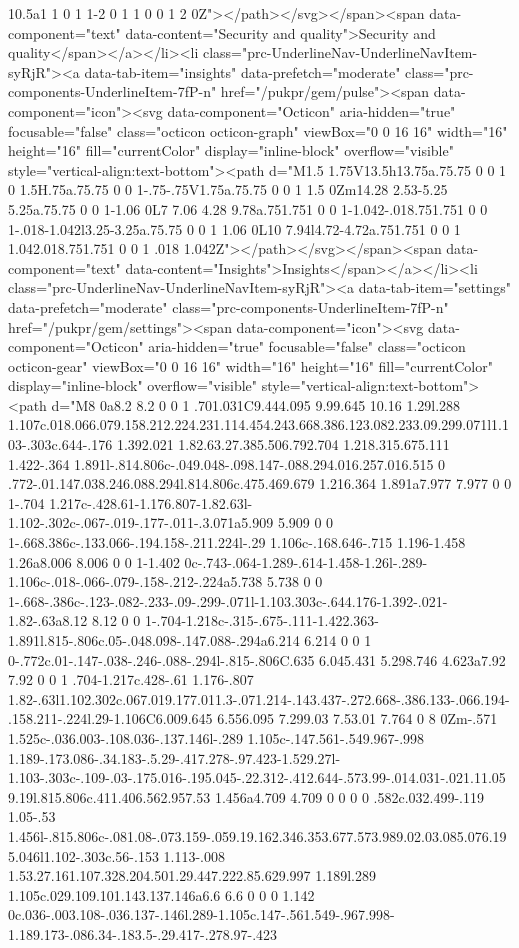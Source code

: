 10.5a1 1 0 1 1-2 0 1 1 0 0 1 2 0Z"></path></svg></span><span data-component="text" data-content="Security and quality">Security and quality</span></a></li><li class="prc-UnderlineNav-UnderlineNavItem-syRjR"><a data-tab-item="insights" data-prefetch="moderate" class="prc-components-UnderlineItem-7fP-n" href="/pukpr/gem/pulse"><span data-component="icon"><svg data-component="Octicon" aria-hidden="true" focusable="false" class="octicon octicon-graph" viewBox="0 0 16 16" width="16" height="16" fill="currentColor" display="inline-block" overflow="visible" style="vertical-align:text-bottom"><path d="M1.5 1.75V13.5h13.75a.75.75 0 0 1 0 1.5H.75a.75.75 0 0 1-.75-.75V1.75a.75.75 0 0 1 1.5 0Zm14.28 2.53-5.25 5.25a.75.75 0 0 1-1.06 0L7 7.06 4.28 9.78a.751.751 0 0 1-1.042-.018.751.751 0 0 1-.018-1.042l3.25-3.25a.75.75 0 0 1 1.06 0L10 7.94l4.72-4.72a.751.751 0 0 1 1.042.018.751.751 0 0 1 .018 1.042Z"></path></svg></span><span data-component="text" data-content="Insights">Insights</span></a></li><li class="prc-UnderlineNav-UnderlineNavItem-syRjR"><a data-tab-item="settings" data-prefetch="moderate" class="prc-components-UnderlineItem-7fP-n" href="/pukpr/gem/settings"><span data-component="icon"><svg data-component="Octicon" aria-hidden="true" focusable="false" class="octicon octicon-gear" viewBox="0 0 16 16" width="16" height="16" fill="currentColor" display="inline-block" overflow="visible" style="vertical-align:text-bottom"><path d="M8 0a8.2 8.2 0 0 1 .701.031C9.444.095 9.99.645 10.16 1.29l.288 1.107c.018.066.079.158.212.224.231.114.454.243.668.386.123.082.233.09.299.071l1.103-.303c.644-.176 1.392.021 1.82.63.27.385.506.792.704 1.218.315.675.111 1.422-.364 1.891l-.814.806c-.049.048-.098.147-.088.294.016.257.016.515 0 .772-.01.147.038.246.088.294l.814.806c.475.469.679 1.216.364 1.891a7.977 7.977 0 0 1-.704 1.217c-.428.61-1.176.807-1.82.63l-1.102-.302c-.067-.019-.177-.011-.3.071a5.909 5.909 0 0 1-.668.386c-.133.066-.194.158-.211.224l-.29 1.106c-.168.646-.715 1.196-1.458 1.26a8.006 8.006 0 0 1-1.402 0c-.743-.064-1.289-.614-1.458-1.26l-.289-1.106c-.018-.066-.079-.158-.212-.224a5.738 5.738 0 0 1-.668-.386c-.123-.082-.233-.09-.299-.071l-1.103.303c-.644.176-1.392-.021-1.82-.63a8.12 8.12 0 0 1-.704-1.218c-.315-.675-.111-1.422.363-1.891l.815-.806c.05-.048.098-.147.088-.294a6.214 6.214 0 0 1 0-.772c.01-.147-.038-.246-.088-.294l-.815-.806C.635 6.045.431 5.298.746 4.623a7.92 7.92 0 0 1 .704-1.217c.428-.61 1.176-.807 1.82-.63l1.102.302c.067.019.177.011.3-.071.214-.143.437-.272.668-.386.133-.066.194-.158.211-.224l.29-1.106C6.009.645 6.556.095 7.299.03 7.53.01 7.764 0 8 0Zm-.571 1.525c-.036.003-.108.036-.137.146l-.289 1.105c-.147.561-.549.967-.998 1.189-.173.086-.34.183-.5.29-.417.278-.97.423-1.529.27l-1.103-.303c-.109-.03-.175.016-.195.045-.22.312-.412.644-.573.99-.014.031-.021.11.059.19l.815.806c.411.406.562.957.53 1.456a4.709 4.709 0 0 0 0 .582c.032.499-.119 1.05-.53 1.456l-.815.806c-.081.08-.073.159-.059.19.162.346.353.677.573.989.02.03.085.076.195.046l1.102-.303c.56-.153 1.113-.008 1.53.27.161.107.328.204.501.29.447.222.85.629.997 1.189l.289 1.105c.029.109.101.143.137.146a6.6 6.6 0 0 0 1.142 0c.036-.003.108-.036.137-.146l.289-1.105c.147-.561.549-.967.998-1.189.173-.086.34-.183.5-.29.417-.278.97-.423 